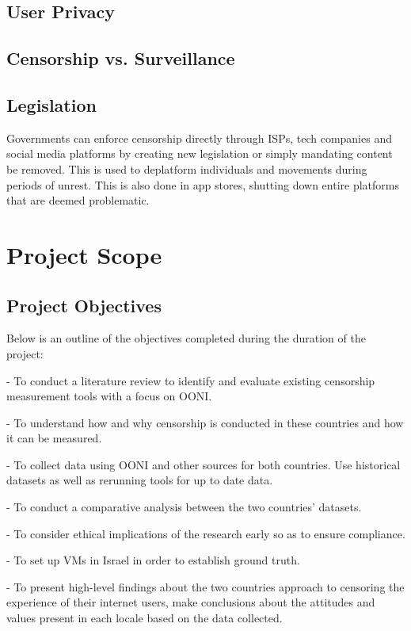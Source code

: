 \subsection{User Privacy}
\subsection{Censorship vs. Surveillance}
\subsection{Legislation}
Governments can enforce censorship directly through ISPs, tech companies and social media platforms by creating new legislation or simply mandating content be removed. This is used to deplatform individuals and movements during periods of unrest. This is also done in app stores, shutting down entire platforms that are deemed problematic. 



\section{Project Scope}
\subsection{Project Objectives}
Below is an outline of the objectives completed during the duration of the project:

-   To conduct a literature review to identify and evaluate existing censorship measurement tools with a focus on OONI. 

-   To understand how and why censorship is conducted in these countries and how it can be measured. 

-   To collect data using OONI and other sources for both countries. Use historical datasets as well as rerunning tools for up to date data. 

-   To conduct a comparative analysis between the two countries’ datasets. 

-   To consider ethical implications of the research early so as to ensure compliance. 

-   To set up VMs in Israel in order to establish ground truth. 

-   To present high-level findings about the two countries approach to censoring the 
experience of their internet users, make conclusions about the attitudes and values 
present in each locale based on the data collected. 

